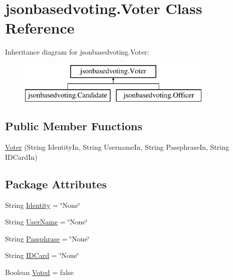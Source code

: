 \hypertarget{classjsonbasedvoting_1_1_voter}{}\section{jsonbasedvoting.\+Voter Class Reference}
\label{classjsonbasedvoting_1_1_voter}
Inheritance diagram for jsonbasedvoting.\+Voter\+:\begin{figure}[H]
\begin{center}
\leavevmode
\includegraphics[height=2.000000cm]{classjsonbasedvoting_1_1_voter}
\end{center}
\end{figure}
\subsection*{Public Member Functions}
\begin{DoxyCompactItemize}
\item 
\mbox{\hyperlink{classjsonbasedvoting_1_1_voter_aca81e3b1df560eed28962dfe89d941b5}{Voter}} (String Identity\+In, String Username\+In, String Passphrase\+In, String I\+D\+Card\+In)
\end{DoxyCompactItemize}
\subsection*{Package Attributes}
\begin{DoxyCompactItemize}
\item 
String \mbox{\hyperlink{classjsonbasedvoting_1_1_voter_a52bcd2c36e61a6230e7e37988243214d}{Identity}} = \char`\"{}None\char`\"{}
\item 
String \mbox{\hyperlink{classjsonbasedvoting_1_1_voter_aafea9e9cee8979d334f367a2055d1923}{User\+Name}} = \char`\"{}None\char`\"{}
\item 
String \mbox{\hyperlink{classjsonbasedvoting_1_1_voter_a837e40aad8acadfa796c4a6e6916cb27}{Passphrase}} = \char`\"{}None\char`\"{}
\item 
String \mbox{\hyperlink{classjsonbasedvoting_1_1_voter_a3b7931f933d5742d73e2c362937de240}{I\+D\+Card}} = \char`\"{}None\char`\"{}
\item 
Boolean \mbox{\hyperlink{classjsonbasedvoting_1_1_voter_a502c74b06ceaadb7eddcbbdc01ffd9b9}{Voted}} = false
\end{DoxyCompactItemize}


